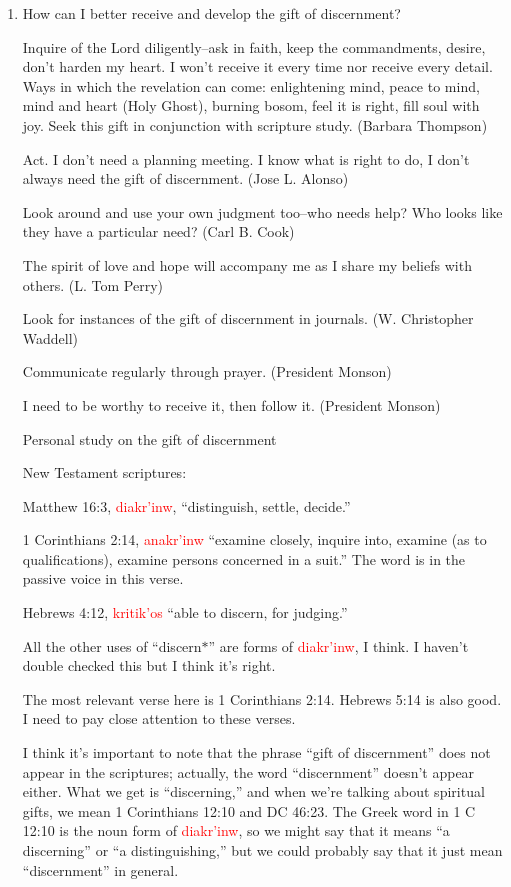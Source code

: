 \begin{enumerate}
\item How can I better receive and develop the gift of discernment?

Inquire of the Lord diligently--ask in faith, keep the commandments, desire, don't harden my heart. I won't receive it every time nor receive every detail. Ways in which the revelation can come: enlightening mind, peace to mind, mind and heart (Holy Ghost), burning bosom, feel it is right, fill soul with joy. Seek this gift in conjunction with scripture study. (Barbara Thompson)

Act. I don't need a planning meeting. I know what is right to do, I don't always need the gift of discernment. (Jose L. Alonso)

Look around and use your own judgment too--who needs help? Who looks like they have a particular need? (Carl B. Cook)

The spirit of love and hope will accompany me as I share my beliefs with others. (L. Tom Perry)

Look for instances of the gift of discernment in journals. (W. Christopher Waddell)

Communicate regularly through prayer. (President Monson)

I need to be worthy to receive it, then follow it. (President Monson)

Personal study on the gift of discernment

New Testament scriptures:

Matthew 16:3, \textcolor{red}{\textgreek{diakr'inw}}, ``distinguish, settle, decide.''

1 Corinthians 2:14, \textcolor{red}{\textgreek{anakr'inw}} ``examine closely, inquire into, examine (as to qualifications), examine persons concerned in a suit.'' The word is in the passive voice in this verse.

Hebrews 4:12, \textcolor{red}{\textgreek{kritik'os}} ``able to discern, for judging.''

All the other uses of ``discern$\ast$'' are forms of \textcolor{red}{\textgreek{diakr'inw}}, I think. I haven't double checked this but I think it's right.

The most relevant verse here is 1 Corinthians 2:14. Hebrews 5:14 is also good. I need to pay close attention to these verses.

I think it's important to note that the phrase ``gift of discernment'' does not appear in the scriptures; actually, the word ``discernment'' doesn't appear either. What we get is ``discerning,'' and when we're talking about spiritual gifts, we mean 1 Corinthians 12:10 and DC 46:23. The Greek word in 1 C 12:10 is the noun form of \textcolor{red}{\textgreek{diakr'inw}}, so we might say that it means ``a discerning'' or ``a distinguishing,'' but we could probably say that it just mean ``discernment'' in general.


\end{enumerate}
